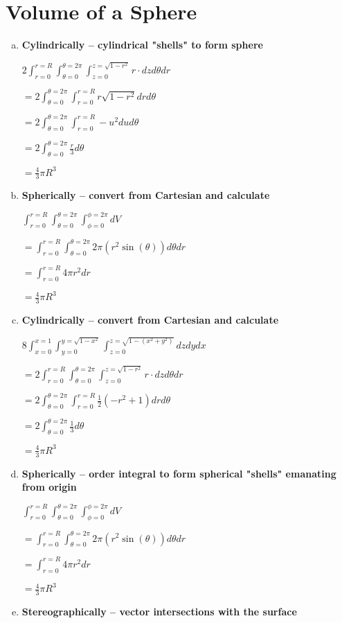 \documentclass{article}
\begin{document}
\section{Volume of a Sphere}
\begin{enumerate}[a.]
	\item \textbf{Cylindrically -- cylindrical "shells" to form sphere}

        $ 2\int_{r = 0}^{r = R} \int_{\theta = 0}^{\theta = 2\pi} \int_{z = 0}^{z = \sqrt{1-r^2}} r \cdot dz d\theta dr$

        $ = 2 \int_{\theta = 0}^{\theta = 2\pi} \int_{r = 0}^{r = R} r \sqrt{1-r^2} dr d\theta$

        $ = 2 \int_{\theta = 0}^{\theta = 2\pi} \int_{r = 0}^{r = R} -u^2 du d\theta$

        $ = 2 \int_{\theta = 0}^{\theta = 2\pi} \frac{r}{3} d\theta $

        $ = \frac{4}{3}\pi R^3 $

	\item \textbf{Spherically -- convert from Cartesian and calculate}

        $\int_{r=0}^{r=R}\int_{\theta=0}^{\theta=2\pi}\int_{\phi=0}^{\phi=2\pi} dV $

        $ = \int_{r=0}^{r=R}\int_{\theta=0}^{\theta=2\pi} 2\pi (r^2\sin(\theta))  d\theta dr $

        $ = \int_{r=0}^{r=R}4\pi r^2 dr $

        $ = \frac{4}{3}\pi R^3 $

	\item \textbf{Cylindrically -- convert from Cartesian and calculate}

        $8\int_{x = 0}^{x = 1} \int_{y = 0}^{y = \sqrt{1-x^2}} \int_{z = 0}^{z = \sqrt{1-(x^2+y^2)}} dz dy dx$

        $ = 2\int_{r = 0}^{r = R} \int_{\theta = 0}^{\theta = 2\pi} \int_{z = 0}^{z = \sqrt{1-r^2}} r \cdot dz d\theta dr$

        $ = 2 \int_{\theta = 0}^{\theta = 2\pi} \int_{r = 0}^{r = R} \frac{1}{2}\left(-r^2+1\right) dr d\theta$

        $ = 2 \int_{\theta = 0}^{\theta = 2\pi} \frac{1}{3} d\theta $

        $ = \frac{4}{3}\pi R^3 $

	\item \textbf{Spherically -- order integral to form spherical "shells" emanating from origin}

        $\int_{r=0}^{r=R}\int_{\theta=0}^{\theta=2\pi}\int_{\phi=0}^{\phi=2\pi} dV $

        $ = \int_{r=0}^{r=R}\int_{\theta=0}^{\theta=2\pi} 2\pi (r^2\sin(\theta))  d\theta dr $

        $ = \int_{r=0}^{r=R}4\pi r^2 dr $

        $ = \frac{4}{3}\pi R^3 $

	\item \textbf{Stereographically -- vector intersections with the surface}
\end{enumerate}
\end{document}
